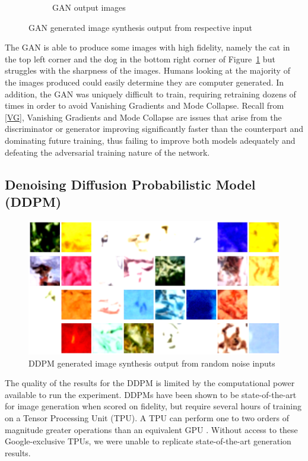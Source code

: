 \documentclass[%
 reprint,
 amsmath,amssymb,
 aps,
]{revtex4-2}
\begin{document}
\begin{figure}[h]
\begin{subfigure}{\columnwidth}
        \caption{GAN output images}
        \label{fig:ganout}
    \end{subfigure}
    \caption{GAN generated image synthesis output from respective input}
    \label{fig:ganresults}
\end{figure}



The GAN is able to produce some images with high fidelity, namely the cat in the top left corner and the dog in the bottom right corner of Figure~\ref{fig:ganout} but struggles with the sharpness of the images. Humans looking at the majority of the images produced could easily determine they are computer generated. In addition, the GAN was uniquely difficult to train, requiring retraining dozens of times in order to avoid Vanishing Gradients and Mode Collapse. Recall from \ref{VG}, Vanishing Gradients and Mode Collapse are issues that arise from the discriminator or generator improving significantly faster than the counterpart and dominating future training, thus failing to improve both models adequately and defeating the adversarial training nature of the network.

\subsection{Denoising Diffusion Probabilistic Model (DDPM)}
\label{ddpm_result_}

\begin{figure}[h]
    \includegraphics[width=0.9\columnwidth]{ddpmout.png}
    \caption{\label{fig:ddpmresults} DDPM generated image synthesis output from random noise inputs}
\end{figure}


The quality of the results for the DDPM is limited by the computational power available to run the experiment. DDPMs have been shown to be state-of-the-art for image generation when scored on fidelity, but require several hours of training on a Tensor Processing Unit (TPU). A TPU can perform one to two orders of magnitude greater operations than an equivalent GPU \cite{googlecloud}. Without access to these Google-exclusive TPUs, we were unable to replicate state-of-the-art generation results.
\end{document}

